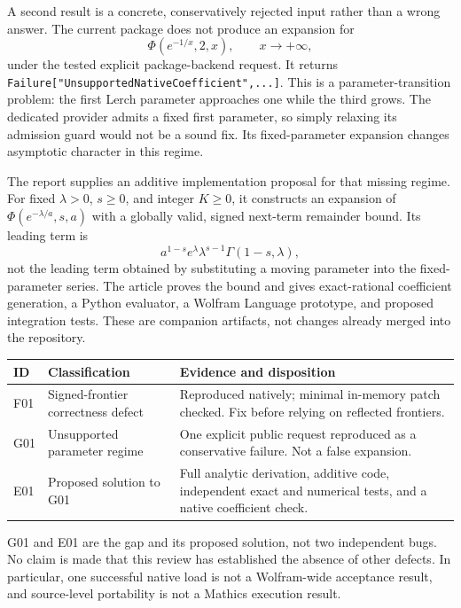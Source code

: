 \documentclass[11pt,a4paper]{article}
\newcommand{\code}[1]{\nolinkurl{#1}}
\newcommand{\PhiL}{\Phi}
\begin{document}
A second result is a concrete, conservatively rejected input rather than a
wrong answer. The current package does not produce an expansion for
\[
 \PhiL(e^{-1/x},2,x),\qquad x\longrightarrow+\infty,
\]
under the tested explicit package-backend request. It returns
\code{Failure["UnsupportedNativeCoefficient",...]}.
This is a parameter-transition problem: the first Lerch parameter approaches
one while the third grows. The dedicated provider admits a fixed first
parameter, so simply relaxing its admission guard would not be a sound fix.
Its fixed-parameter expansion changes asymptotic character in this regime.
\cite{dirichlet}

The report supplies an additive implementation proposal for that missing
regime. For fixed $\lambda>0$, $s\geq0$, and integer $K\geq0$, it constructs an
expansion of $\PhiL(e^{-\lambda/a},s,a)$ with a globally valid, signed
next-term remainder bound. Its leading term is
\[
 a^{1-s}e^\lambda\lambda^{s-1}\Gamma(1-s,\lambda),
\]
not the leading term obtained by substituting a moving parameter into the
fixed-parameter series. The article proves the bound and gives exact-rational
coefficient generation, a Python evaluator, a Wolfram Language prototype,
and proposed integration tests. These are companion artifacts, not changes
already merged into the repository.

\begin{center}
\begin{tabular}{@{}p{}p{}p{}@{}}
\toprule
ID & Classification & Evidence and disposition\\
\midrule
F01 & Signed-frontier correctness defect & Reproduced natively; minimal
in-memory patch checked. Fix before relying on reflected frontiers.\\[5pt]
G01 & Unsupported parameter regime & One explicit public request reproduced
as a conservative failure. Not a false expansion.\\[5pt]
E01 & Proposed solution to G01 & Full analytic derivation, additive code,
independent exact and numerical tests, and a native coefficient check.\\
\bottomrule
\end{tabular}
\end{center}

G01 and E01 are the gap and its proposed solution, not two independent bugs.
No claim is made that this review has established the absence of other defects.
In particular, one successful native load is not a Wolfram-wide acceptance
result, and source-level portability is not a Mathics execution result.
\end{document}
